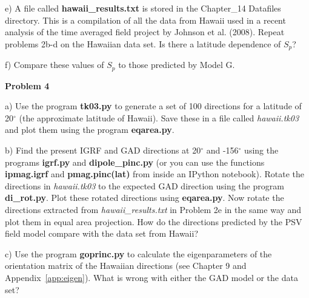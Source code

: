 {e) A file called {\bf hawaii\_results.txt} is stored in the Chapter\_14 Datafiles directory.  This is a compilation of all the data from Hawaii used in a recent analysis of the time averaged field project by Johnson et al. (2008). \nocite{johnson08}
Repeat problems 2b-d on the Hawaiian data set.  Is there a latitude dependence of $S_p$? 


f) Compare these values of $S_p$  to those predicted by Model G. 



{\bf Problem 4}

a) Use the program {\bf tk03.py} to generate a set of 100 directions for a latitude of 20$^{\circ}$ (the approximate latitude of Hawaii). Save these in a file called {\it hawaii.tk03} and plot them using the program {\bf eqarea.py}.  

b)  Find the present IGRF and GAD directions at 20$^{\circ}$ and -156$^{\circ}$ using the programs {\bf igrf.py} and {\bf dipole\_pinc.py} (or you can use the functions {\bf  ipmag.igrf} and {\bf pmag.pinc(lat)} from inside an IPython notebook).    Rotate the directions in {\it hawaii.tk03}  to the expected GAD direction using the program {\bf di\_rot.py}.  
Plot these rotated directions using {\bf eqarea.py}.  Now rotate the directions extracted from {\it hawaii\_results.txt} in Problem 2e in the same way and plot them in equal area projection.  How do the directions predicted by the PSV field model compare with the data set from Hawaii?  

c) Use the program {\bf goprinc.py} to calculate the eigenparameters of the orientation matrix of the Hawaiian directions (see Chapter 9 and Appendix~\ref{app:eigen}).   What is wrong with either the GAD model or the data set?  


}





